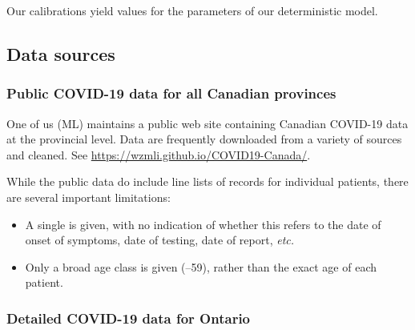 \documentclass[12pt]{article}\usepackage[]{graphicx}\usepackage[]{color}
\begin{document}
Our calibrations yield values for the parameters of our
deterministic model.

\subsection{Data sources}


\subsubsection*{Public COVID-19 data for all Canadian provinces}

One of us (ML) maintains a public web site containing Canadian
COVID-19 data at the provincial level.  Data are frequently downloaded
from a variety of sources and cleaned.  See
\url{https://wzmli.github.io/COVID19-Canada/}.

While the public data do include line lists of records for individual
patients, there are several important limitations: 
\begin{itemize}
\item A single  is given, with no indication of
  whether this refers to the date of onset of symptoms, date of
  testing, date of report, \emph{etc.}
\item Only a broad age class is given (--59), rather than the
  exact age of each patient.
\end{itemize}

\subsubsection*{Detailed COVID-19 data for Ontario}
\end{document}
